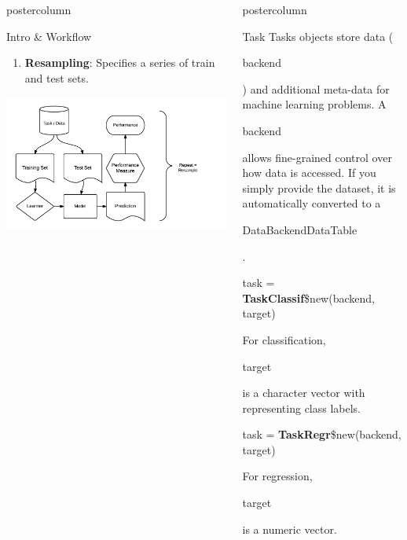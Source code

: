 \documentclass{beamer}
\newlength{\columnheight} %
\newcommand{\codeinline}[1]{\begin{codeboxinline}#1\end{codeboxinline}}
\begin{document}
\begin{frame}[fragile]{}
\begin{columns}
\begin{column}{.245\textwidth}
\begin{beamercolorbox}[center]{postercolumn}
\begin{minipage}{.98\textwidth}
{\begin{myblock}{Intro \& Workflow}
\begin{enumerate}
								\item \textbf{Resampling}: Specifies a series of train and test sets.
							\end{enumerate}
							\includegraphics[width=\textwidth]{img/ml_abstraction.png}
						\end{myblock}
					}
				\end{minipage}
			\end{beamercolorbox}
		\end{column}
		\begin{column}{.245\textwidth}
			\begin{beamercolorbox}[center]{postercolumn}
				\begin{minipage}{.98\textwidth}
					\parbox[t][\columnheight]{\textwidth}{
						\begin{myblock}{Task}
							Tasks objects store data (\codeinline{backend}) and additional meta-data for machine learning problems. A \codeinline{backend} allows fine-grained control over how data is accessed. If you simply provide the dataset, it is automatically converted to a \codeinline{DataBackendDataTable}.
							\\
							\begin{codebox}
								task = \textbf{TaskClassif}\$new(backend, target)
							\end{codebox}
							For classification, \codeinline{target} is a character vector with representing class labels.
							\\
							\begin{codebox}
								task = \textbf{TaskRegr}\$new(backend, target)
							\end{codebox}
							For regression, \codeinline{target} is a numeric vector.
							\\
							\begin{codebox}

\end{codebox}
\end{myblock}}
\end{minipage}
\end{beamercolorbox}
\end{column}
\end{columns}
\end{frame}
\end{document}
